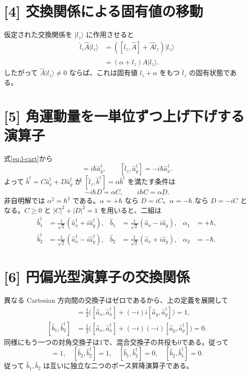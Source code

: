 \documentclass[11pt,a4paper]{article}
\begin{document}
\section*{[4] 交換関係による固有値の移動}
仮定された交換関係を $|l_z\rangle$ に作用させると
\begin{align}
 \hat l_z\hat A|l_z\rangle
 &=([\hat l_z,\hat A]+\hat A\hat l_z)|l_z\rangle\\
 &=(\alpha+l_z)\hat A|l_z\rangle.
\end{align}
したがって $\hat A|l_z\rangle\ne0$ ならば、これは固有値
$l_z+\alpha$ をもつ $\hat l_z$ の固有状態である。

\section*{[5] 角運動量を一単位ずつ上げ下げする演算子}
式\eqref{eq:l-cart}から
\begin{equation}
 [\hat l_z,\hat a_x^\dagger]=i\hbar\hat a_y^\dagger,
 \qquad
 [\hat l_z,\hat a_y^\dagger]=-i\hbar\hat a_x^\dagger.
\end{equation}
よって $\hat b^\dagger=C\hat a_x^\dagger+D\hat a_y^\dagger$ が
$[\hat l_z,\hat b^\dagger]=\alpha\hat b^\dagger$ を満たす条件は
\begin{equation}
 -i\hbar D=\alpha C,\qquad i\hbar C=\alpha D.
 \label{eq:CD}
\end{equation}
非自明解では $\alpha^2=\hbar^2$ である。$\alpha=+\hbar$ なら
$D=iC$、$\alpha=-\hbar$ なら $D=-iC$ となる。$C\ge0$ と
$|C|^2+|D|^2=1$ を用いると、二組は
\begin{align}
 \hat b_1^\dagger&=\frac{1}{\sqrt2}
       (\hat a_x^\dagger+i\hat a_y^\dagger),&
 \hat b_1&=\frac{1}{\sqrt2}(\hat a_x-i\hat a_y),&\alpha_1&=+\hbar,\\
 \hat b_2^\dagger&=\frac{1}{\sqrt2}
       (\hat a_x^\dagger-i\hat a_y^\dagger),&
 \hat b_2&=\frac{1}{\sqrt2}(\hat a_x+i\hat a_y),&\alpha_2&=-\hbar.
\end{align}
\section*{[6] 円偏光型演算子の交換関係}
異なる Cartesian 方向間の交換子はゼロであるから、上の定義を展開して
\begin{align}
 [\hat b_1,\hat b_1^\dagger]
 &=\tfrac12\bigl([\hat a_x,\hat a_x^\dagger]+(-i)i[\hat a_y,\hat a_y^\dagger]\bigr)=1,\\
 [\hat b_1,\hat b_2^\dagger]
 &=\tfrac12\bigl([\hat a_x,\hat a_x^\dagger]+(-i)(-i)[\hat a_y,\hat a_y^\dagger]\bigr)=0.
\end{align}
同様にもう一つの対角交換子は1で、混合交換子の共役も0である。従って
\begin{equation}
 [\hat b_1,\hat b_1^\dagger]=1,\quad
 [\hat b_2,\hat b_2^\dagger]=1,\quad
 [\hat b_1,\hat b_2^\dagger]=0,\quad
 [\hat b_2,\hat b_1^\dagger]=0.
\end{equation}
従って $\hat b_1,\hat b_2$ は互いに独立な二つのボース昇降演算子である。
\end{document}
